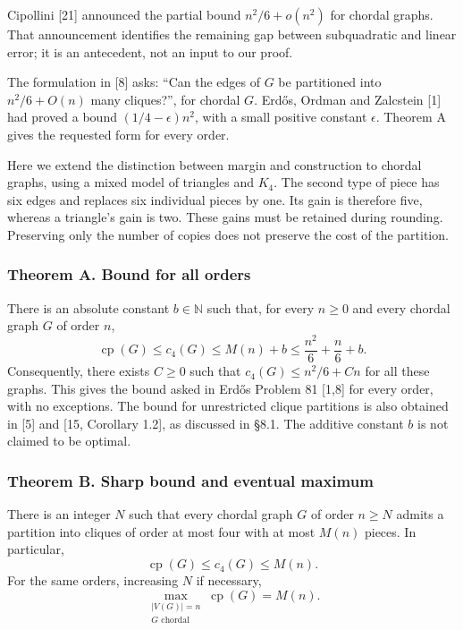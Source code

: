 \documentclass[english,11pt,a4paper]{article}
\begin{document}
Cipollini {[}21{]} announced the partial bound \(n^2/6+o(n^2)\) for chordal graphs. That announcement identifies the remaining gap between subquadratic and linear error; it is an antecedent, not an input to our proof.

The formulation in {[}8{]} asks: ``Can the edges of \(G\) be partitioned into \(n^2/6+O(n)\) many cliques?'', for chordal \(G\). Erdős, Ordman and Zalcstein {[}1{]} had proved a bound \((1/4-\epsilon)n^2\), with a small positive constant \(\epsilon\). Theorem A gives the requested form for every order.

Here we extend the distinction between margin and construction to chordal graphs, using a mixed model of triangles and \(K_4\). The second type of piece has six edges and replaces six individual pieces by one. Its gain is therefore five, whereas a triangle's gain is two. These gains must be retained during rounding. Preserving only the number of copies does not preserve the cost of the partition.

\subsubsection{Theorem A. Bound for all orders}\label{theorem-a.-bound-for-all-orders}

There is an absolute constant \(b\in\mathbb N\) such that, for every \(n\ge0\) and every chordal graph \(G\) of order \(n\), \[
\operatorname{cp}(G)\le c_4(G)\le M(n)+b
\le\frac{n^2}{6}+\frac n6+b.
\tag{A}
\] Consequently, there exists \(C\ge0\) such that \(c_4(G)\le n^2/6+Cn\) for all these graphs. This gives the bound asked in Erdős Problem 81 {[}1,8{]} for every order, with no exceptions. The bound for unrestricted clique partitions is also obtained in {[}5{]} and {[}15, Corollary 1.2{]}, as discussed in §8.1. The additive constant \(b\) is not claimed to be optimal.

\subsubsection{Theorem B. Sharp bound and eventual maximum}\label{theorem-b.-sharp-bound-and-eventual-maximum}

There is an integer \(N\) such that every chordal graph \(G\) of order \(n\ge N\) admits a partition into cliques of order at most four with at most \(M(n)\) pieces. In particular, \[
\operatorname{cp}(G)\le c_4(G)\le M(n).
\tag{1.1}
\] For the same orders, increasing \(N\) if necessary, \[
\max_{\substack{|V(G)|=n\\G\text{ chordal}}}\operatorname{cp}(G)=M(n).
\tag{1.2}
\]
\end{document}
